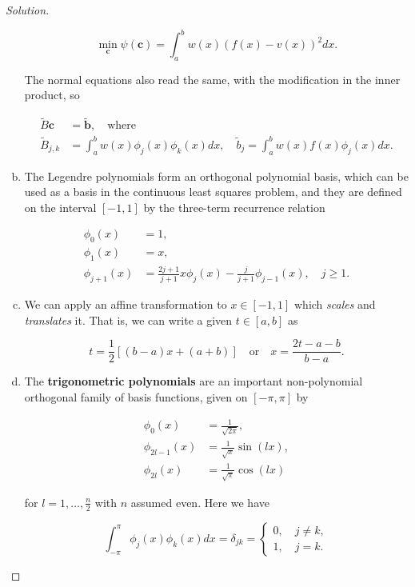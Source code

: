 \documentclass[12pt,a4]{article}
\theoremstyle{definition}
\begin{document}
\begin{proof}[Solution]
\begin{enumerate}[(a)]
		\[
		\min_{\mathbf{c}} \psi(\mathbf{c}) = \int_a^b w(x) (f(x) - v(x))^2 dx {.}
		\]
		
		\noindent The normal equations also read the same, with the modification in the inner product, so 
		
		\begin{align*}
		\tilde{B} \mathbf{c} &= \tilde{\mathbf{b}} {,} \quad \text{where} \\
		\tilde{B}_{j, k} &= \int_a^b w(x) \phi_j(x) \phi_k(x) dx {,} \quad \tilde{b}_j = \int_a^b w(x) f(x) \phi_j(x) dx {.}
		\end{align*}
		
		\item The Legendre polynomials form an orthogonal polynomial basis, which can be used as a basis in the continuous least squares problem, and they are defined on the interval $[-1, 1]$ by the three-term recurrence relation 
		
		\begin{align*}
		\phi_0(x) &= 1 {,} \\
		\phi_1(x) &= x {,} \\
		\phi_{j + 1}(x) &= \frac{2 j + 1}{j + 1} x \phi_j(x) - \frac{j}{j + 1} \phi_{j - 1}(x) {,} \quad j \geq 1 {.}
		\end{align*}
		
		\item We can apply an affine transformation to $x \in [-1, 1]$ which \emph{scales} and \emph{translates} it. That is, we can write a given $t \in [a, b]$ as 
		
		\[
		t = \frac{1}{2} [(b - a) x + (a + b)] \quad \text{or} \quad x = \frac{2 t - a - b}{b - a} {.}
		\]
		
		\item The \textbf{trigonometric polynomials} are an important non-polynomial orthogonal family of basis functions, given on $[-\pi, \pi]$ by 
		
		\begin{align*}
		\phi_0(x) &= \frac{1}{\sqrt{2 \pi}} {,} \\
		\phi_{2 l - 1}(x) &= \frac{1}{\sqrt{x}} \sin(l x) {,} \\
		\phi_{2 l}(x) &= \frac{1}{\sqrt{\pi}} \cos(l x) 
		\end{align*}
		
		\noindent for $l = 1, \ldots, \frac{n}{2}$ with $n$ assumed even. Here we have 
		
		\[
		\int_{- \pi}^\pi \phi_j(x) \phi_k(x) dx = \delta_{j k } = \begin{cases}
		0 {,} \quad j \neq k {,} \\
		1 {,} \quad j = k {.}
		\end{cases}
		\]
		

\end{enumerate}
\end{proof}
\end{document}
